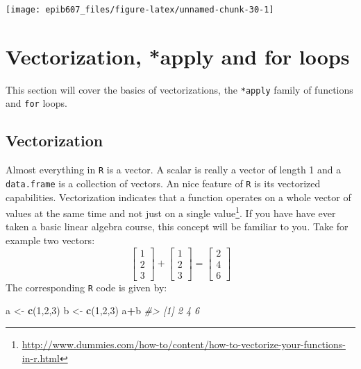 \documentclass[]{book}
\makeatletter
\newenvironment{Shaded}{\begin{snugshade}}{\end{snugshade}}
\newcommand{\KeywordTok}[1]{\textcolor[rgb]{0.13,0.29,0.53}{\textbf{#1}}}
\newcommand{\DecValTok}[1]{\textcolor[rgb]{0.00,0.00,0.81}{#1}}
\newcommand{\StringTok}[1]{\textcolor[rgb]{0.31,0.60,0.02}{#1}}
\newcommand{\CommentTok}[1]{\textcolor[rgb]{0.56,0.35,0.01}{\textit{#1}}}
\newcommand{\OperatorTok}[1]{\textcolor[rgb]{0.81,0.36,0.00}{\textbf{#1}}}
\newcommand{\NormalTok}[1]{#1}
\let\rmarkdownfootnote\footnote%
\def\footnote{\protect\rmarkdownfootnote}
\newenvironment{kframe}{%
\medskip{}
\setlength{\fboxsep}{.8em}
 \def\at@end@of@kframe{}%
 \ifinner\ifhmode%
  \def\at@end@of@kframe{\end{minipage}}%
  \begin{minipage}{\columnwidth}%
 \fi\fi%
 \def\FrameCommand##1{\hskip\@totalleftmargin \hskip-\fboxsep
 \colorbox{shadecolor}{##1}\hskip-\fboxsep
     \hskip-\linewidth \hskip-\@totalleftmargin \hskip\columnwidth}%
 \MakeFramed {\advance\hsize-\width
   \@totalleftmargin\z@ \linewidth\hsize
   \@setminipage}}%
 {\par\unskip\endMakeFramed%
 \at@end@of@kframe}
\renewenvironment{Shaded}{\begin{kframe}}{\end{kframe}}
\theoremstyle{definition}
\theoremstyle{definition}
\theoremstyle{definition}
\theoremstyle{remark}
\makeatother
\begin{document}
\begin{center}\texttt{[image: epib607\_files/figure-latex/unnamed-chunk-30-1]} \end{center}

\appendix


\chapter{Vectorization, *apply and for
loops}\label{vectorization-apply-and-for-loops}

This section will cover the basics of vectorizations, the
\texttt{*apply} family of functions and \texttt{for} loops.

\section{Vectorization}\label{vectorization}

Almost everything in \texttt{R} is a vector. A scalar is really a vector
of length 1 and a \texttt{data.frame} is a collection of vectors. An
nice feature of \texttt{R} is its vectorized capabilities. Vectorization
indicates that a function operates on a whole vector of values at the
same time and not just on a single value\footnote{\url{http://www.dummies.com/how-to/content/how-to-vectorize-your-functions-in-r.html}}.
If you have have ever taken a basic linear algebra course, this concept
will be familiar to you. \newline  \vspace{0.1in} Take for example two
vectors: \newline
\vspace{0.1in} \[
\begin{bmatrix} 1 \\ 2 \\ 3 \end{bmatrix} + 
\begin{bmatrix} 1 \\ 2 \\ 3 \end{bmatrix} =
\begin{bmatrix} 2 \\ 4 \\ 6 \end{bmatrix}
\] \newline  \vspace{0.1in} The corresponding \texttt{R} code is given
by:

\begin{Shaded}
\begin{Highlighting}[]
\NormalTok{a <-}\StringTok{ }\KeywordTok{c}\NormalTok{(}\DecValTok{1}\NormalTok{,}\DecValTok{2}\NormalTok{,}\DecValTok{3}\NormalTok{)}
\NormalTok{b <-}\StringTok{ }\KeywordTok{c}\NormalTok{(}\DecValTok{1}\NormalTok{,}\DecValTok{2}\NormalTok{,}\DecValTok{3}\NormalTok{)}
\NormalTok{a}\OperatorTok{+}\NormalTok{b}
\CommentTok{#> [1] 2 4 6}
\end{Highlighting}
\end{Shaded}
\end{document}
